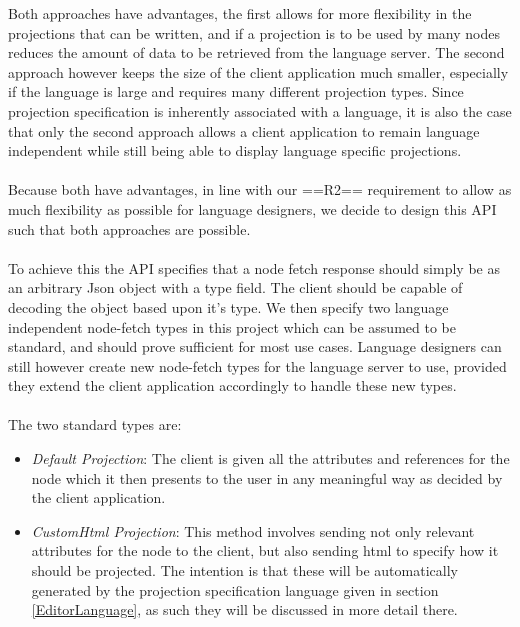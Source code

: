 \documentclass{article}
\begin{document}
Both approaches have advantages, the first allows for more flexibility in the projections that can be written, and if a projection is to be used by many nodes reduces the amount of data to be retrieved from the language server. The second approach however keeps the size of the client application much smaller, especially if the language is large and requires many different projection types. Since projection specification is inherently associated with a language, it is also the case that only the second approach allows a client application to remain language independent while still being able to display language specific projections.
\\
\\
Because both have advantages, in line with our ==R2== requirement to allow as much flexibility as possible for language designers, we decide to design this API such that both approaches are possible.
\\
\\
To achieve this the API specifies that a node fetch response should simply be as an arbitrary Json object with a type field. The client should be capable of decoding the object based upon it's type. We then specify two language independent node-fetch types in this project which can be assumed to be standard, and should prove sufficient for most use cases. Language designers can still however create new node-fetch types for the language server to use, provided they extend the client application accordingly to handle these new types.
\\
\\
The two standard types are:
\begin{itemize}
\item \emph{Default Projection}: The client is given all the attributes and references for the node which it then presents to the user in any meaningful way as decided by the client application.
\item \emph{CustomHtml Projection}: This method involves sending not only relevant attributes for the node to the client, but also sending html to specify how it should be projected. The intention is that these will be automatically generated by the projection specification language given in section \ref{EditorLanguage}, as such they will be discussed in more detail there.
\end{itemize}

\end{document}

